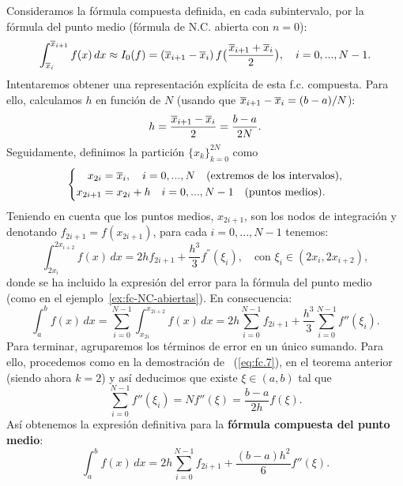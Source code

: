 \begin{example}
  Consideramos la fórmula compuesta definida, en cada subintervalo,
  por la fórmula del punto medio (fórmula de N.C. abierta con $n=0$):
  \begin{equation*}
    \int_{\overline x_{i}}^{\overline x_{i+1}} f(x)\, dx \approx I_0(f)=
    (\overline x_{i+1}-\overline x_{i}) \, f\big(\frac{\overline x_{i+1}+\overline x_{i}} 2 \big), \quad i=0,...,N-1.
  \end{equation*}
  Intentaremos obtener una representación explícita de esta f.c.
  compuesta. Para ello, calculamos $h$ en función de $N$ (usando que
  $\overline x_{i+1}-\overline x_{i} = (b-a)/N$):
  $$
  h= \frac{\overline x_{i+1}-\overline x_{i}}2 = \frac{b-a}{2N}.
  $$
  Seguidamente, definimos la partición $\{x_k\}_{k=0}^{2N}$ como
  \begin{equation*}
    \left\{
      \begin{aligned}
        x_{2i} &= \overline x_i, \quad i=0,...,N \quad \text{(extremos de los
          intervalos)},
        \\
        x_{2i+1} &= x_{2i}+h \quad i=0,...,N-1
        \quad\text{(puntos medios)}.
      \end{aligned}
      \right.
    \end{equation*}
    Teniendo en cuenta que los puntos medios, $x_{2i+1}$, son los
    nodos de integración y denotando $f_{2i+1}=f(x_{2i+1})$,
    para cada $i=0,...,N-1$ tenemos:
  \begin{equation*}
    \int_{2x_i}^{2x_{i+2}} f(x)\, dx =
    2hf_{2i+1} +
    \frac{h^3}{3}f^{''}(\xi_i), \quad \text{con }
    \xi_i\in(2x_i,2x_{i+2}),
  \end{equation*}
  donde se ha incluido la expresión del error para la fórmula del
  punto medio (como en el ejemplo~\ref{ex:fc-NC-abiertas}). En
  consecuencia:
  \begin{equation*}
    \int_a^b f(x)\,dx = \sum_{i=0}^{N-1} \int_{x_{2i}}^{x_{2i+2}} f(x)\,dx
    = 2h \sum_{i=0}^{N-1} f_{2i+1} + \frac{h^3}{3} \sum_{i=0}^{N-1}f''(\xi_i).
  \end{equation*}
  Para terminar, agruparemos los términos de error en un único
  sumando. Para ello, procedemos como en la demostración de
  ~(\ref{eq:fc.7}), en el teorema anterior (siendo ahora $k=2$) y así
  deducimos que existe $\xi\in(a,b)$ tal que
  $$
  \sum_{i=0}^{N-1}f''(\xi_i)=Nf''(\xi)=\frac{b-a}{2h}f(\xi).
  $$
  Así obtenemos la expresión definitiva para la \textbf{fórmula compuesta del
  punto medio}:
  \begin{equation*}
    \int_a^b f(x)\,dx
    = 2h \sum_{i=0}^{N-1} f_{2i+1} + \frac{(b-a)h^2}{6} f''(\xi).
  \end{equation*}
\end{example}

